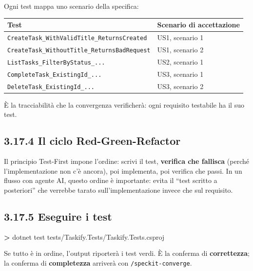 \documentclass[
  italian,
  10pt,
]{book}
\newenvironment{Shaded}{\begin{snugshade}}{\end{snugshade}}
\newcommand{\BuiltInTok}[1]{#1}
\newcommand{\NormalTok}[1]{#1}
\newcommand{\OperatorTok}[1]{\textcolor[rgb]{0.81,0.36,0.00}{\textbf{#1}}}
\newcounter{none} %
\begin{document}
Ogni test mappa uno scenario della specifica:

{\def\LTcaptype{none} %
\begin{longtable}[]{@{}ll@{}}
\toprule\noalign{}
Test & Scenario di accettazione \\
\midrule\noalign{}
\endhead
\bottomrule\noalign{}
\endlastfoot
\texttt{CreateTask\_WithValidTitle\_ReturnsCreated} & US1, scenario 1 \\
\texttt{CreateTask\_WithoutTitle\_ReturnsBadRequest} & US1, scenario
2 \\
\texttt{ListTasks\_FilterByStatus\_...} & US2, scenario 1 \\
\texttt{CompleteTask\_ExistingId\_...} & US3, scenario 1 \\
\texttt{DeleteTask\_ExistingId\_...} & US3, scenario 2 \\
\end{longtable}
}

È la tracciabilità che la convergenza verificherà: ogni requisito
testabile ha il suo test.

\subsection{3.17.4 Il ciclo
Red-Green-Refactor}\label{il-ciclo-red-green-refactor}

Il principio Test-First impone l'ordine: scrivi il test,
\textbf{verifica che fallisca} (perché l'implementazione non c'è
ancora), poi implementa, poi verifica che passi. In un flusso con agente
AI, questo ordine è importante: evita il ``test scritto a posteriori''
che verrebbe tarato sull'implementazione invece che sul requisito.

\subsection{3.17.5 Eseguire i test}\label{eseguire-i-test}

\begin{Shaded}
\begin{Highlighting}[]
\OperatorTok{\textgreater{}}\NormalTok{ dotnet }\BuiltInTok{test}\NormalTok{ tests/Taskify.Tests/Taskify.Tests.csproj}
\end{Highlighting}
\end{Shaded}

Se tutto è in ordine, l'output riporterà i test verdi. È la conferma di
\textbf{correttezza}; la conferma di \textbf{completezza} arriverà con
\texttt{/speckit-converge}.
\end{document}
